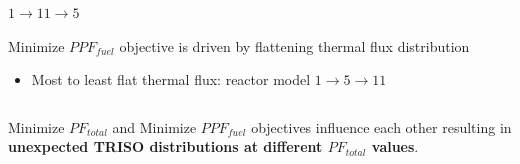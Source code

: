 \begin{frame}
\begin{columns}
\begin{column}{0.6\linewidth}
\begin{itemize}
                $1 \rightarrow 11 \rightarrow 5$
            \end{itemize}
            Minimize $PPF_{fuel}$ objective is driven by flattening thermal flux 
            distribution 
            \begin{itemize}
                \item Most to least flat thermal flux: reactor model 
                $1 \rightarrow 5 \rightarrow 11$
            \end{itemize}
        \end{column}
    \end{columns}
    \vspace{-0.5cm}
    \begin{tcolorbox}[colback=illiniorange,colframe=illiniorange!50!black]
        Minimize $PF_{total}$ and Minimize $PPF_{fuel}$ objectives 
        influence each other resulting in \textbf{unexpected TRISO distributions at 
        different $PF_{total}$ values}. 
    \end{tcolorbox}
\end{frame}

